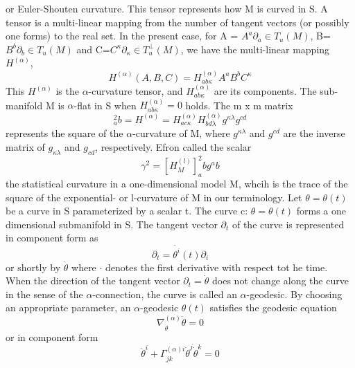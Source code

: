 or Euler-Shouten curvature. This tensor represents how M is curved in S. 
   A tensor is a multi-linear mapping from the number of tangent vectors (or possibly one forms) to the real set. 
      In the present case, for A = $A^a \partial_a \in T_u(M)$, B= $B^b \partial_b \in T_u(M)$ and 
      C=$C^\kappa \partial_\kappa \in T_u^{\bot}(M)$, we have the multi-linear mapping $H^{(\alpha)}$,
           \begin{equation*}
            H^{(\alpha)}(A,B,C) = H^{(\alpha)}_{ab \kappa} A^aB^bC^\kappa
           \end{equation*}
This $H^{(\alpha)}$ is the $\alpha$-curvature tensor, and $H^{(\alpha)}_{ab \kappa}$ are its components. 
The sub-manifold M is $\alpha$-flat in S when $H^{(\alpha)}_{ab \kappa} = 0$ holds. The m x m matrix 
\begin{equation*}
 [H_M^{(\alpha)}]^2_ab = H^{(\alpha)} = H_{ac \kappa}^{(\alpha)} H_{bd \lambda}^{(\alpha)} g^{\kappa \lambda} g^{cd}
\end{equation*}
represents the square of the $\alpha$-curvature of M, where $g^{\kappa \lambda}$ and $g^{cd}$ are the inverse matrix 
of $g_{\kappa \lambda}$ and $g_{cd}$, respectively. Efron called the scalar
\begin{equation*}
 \gamma^{2} = [H_M^{(l)}]^2_ab g^ab
\end{equation*}
the statistical curvature in a one-dimensional model M, whcih is the trace of the square of the exponential- or 
l-curvature of M in our terminology. 
  Let $\theta = \theta(t)$ be a curve in S parameterized by a scalar t. The curve c: $\theta = \theta(t)$ forms a one 
  dimensional submanifold in S. 
  The tangent vector $\partial_t$ of the curve is represented in component form as 
  \begin{equation*}
   \partial_t = \dot{\theta^{i}}(t) \partial_i
  \end{equation*}
or shortly by $\dot{\theta}$ where $\cdot$ denotes the first derivative with respect tot he time. 
When the direction of the tangent vector $\partial_t = \dot{\theta}$ does not change along the curve in the sense of 
the $\alpha$-connection, the curve is called an $\alpha$-geodesic.
   By choosing an appropriate parameter, an $\alpha$-geodesic $\theta(t)$ satisfies the geodesic equation
   \begin{equation*}
    \nabla_{\dot{\theta}}^{(\alpha)}\dot{\theta} = 0
   \end{equation*}
or in component form 
\begin{equation}\label{2.6}
 \ddot{\theta}^{i} + \Gamma^{(\alpha)i}_{jk}\dot{\theta}^{j} \dot{\theta}^k = 0
\end{equation}

